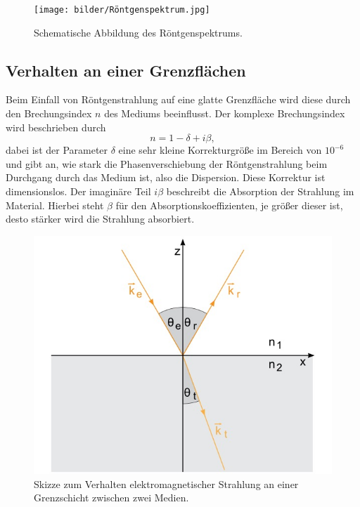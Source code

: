 \begin{figure}
    \texttt{[image: bilder/Röntgenspektrum.jpg]}
    \caption{Schematische Abbildung des Röntgenspektrums.}
    \label{fig:Abbildung 1}
\end{figure}
\cite{Röntgenspektrum}

\subsection{Verhalten an einer Grenzflächen}
Beim Einfall von Röntgenstrahlung auf eine glatte Grenzfläche wird diese durch den Brechungsindex $n$ des Mediums beeinflusst.
Der komplexe Brechungsindex wird beschrieben durch
\begin{equation}
    n=1-\delta+i\beta,
    \label{eq:brechungsindex}
\end{equation}
dabei ist der Parameter \(\delta\) eine sehr kleine Korrekturgröße im Bereich von $10^{-6}$
und gibt an, wie stark die Phasenverschiebung der Röntgenstrahlung beim Durchgang durch das Medium ist, also die Dispersion.
Diese Korrektur ist dimensionslos. Der imaginäre Teil \(i\beta\) beschreibt die Absorption der Strahlung im Material.
Hierbei steht \(\beta\) für den Absorptionskoeffizienten, je größer dieser ist, desto stärker wird die Strahlung absorbiert.

\begin{figure}
    \includegraphics[width=\textwidth]{bilder/Reflexion.jpg}
    \caption{Skizze zum Verhalten elektromagnetischer Strahlung an einer Grenzschicht zwischen zwei Medien. \cite{Reflexion}}
    \label{fig:Abbildung 2}
\end{figure}

